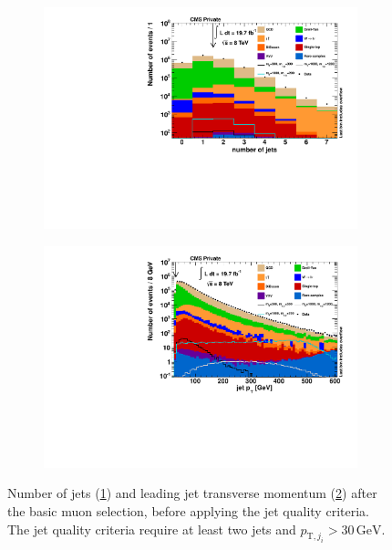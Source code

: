 \begin{figure}[htb!]
  \centering
  \begin{subfigure}[b]{0.495\textwidth}
    \centering
    \includegraphics[width=\textwidth]{plots/jet_n.pdf}
    \caption{\label{fig:jetn}}
  \end{subfigure}
  \begin{subfigure}[b]{0.495\textwidth}
    \centering
    \includegraphics[width=\textwidth]{plots/jet_pt1.pdf}
    \caption{\label{fig:jetpt1}}
  \end{subfigure}
  \caption{Number of jets (\ref{fig:jetn}) and leading jet transverse momentum (\ref{fig:jetpt1}) after the basic muon selection, before applying the jet quality criteria. The jet quality criteria require at least two jets and $p_{\text{T}, j_i} > 30\,\text{GeV}$.}
  \label{fig:jetqualy}
\end{figure}

